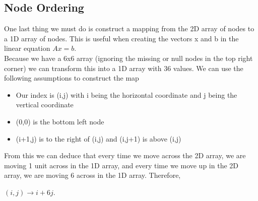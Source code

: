 \documentclass[12pt,a4paper]{article}
\begin{document}
\subsection{Node Ordering}
One last thing we must do is construct a mapping from the 2D array of nodes to a 1D array of nodes. This is useful when creating the vectors x and b in the linear equation $Ax=b$.
\\
Because we have a 6x6 array (ignoring the missing or null nodes in the top right corner) we can transform this into a 1D array with 36 values. We can use the following assumptions to construct the map \begin{itemize}\item Our index is (i,j) with i being the horizontal coordinate and j being the vertical coordinate \item (0,0) is the bottom left node \item (i+1,j) is to the right of (i,j) and (i,j+1) is above (i,j)\end{itemize}
From this we can deduce that every time we move across the 2D array, we are moving 1 unit across in the 1D array, and every time we move up in the 2D array, we are moving 6 across in the 1D array. Therefore,
\begin{center}
$(i,j) \to i+6j$.
\end{center}
\end{document}
